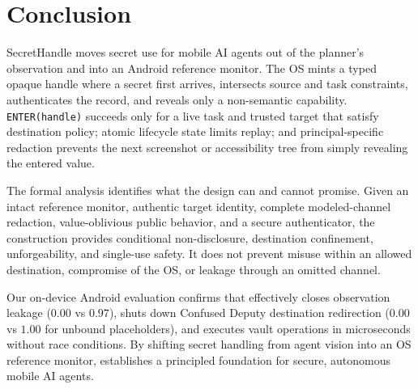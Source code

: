 \section{Conclusion}
\label{sec:conclusion}

SecretHandle moves secret use for mobile AI agents out of the planner's observation and into an Android reference monitor. The OS mints a typed opaque handle where a secret first arrives, intersects source and task constraints, authenticates the record, and reveals only a non-semantic capability. \texttt{ENTER(handle)} succeeds only for a live task and trusted target that satisfy destination policy; atomic lifecycle state limits replay; and principal-specific redaction prevents the next screenshot or accessibility tree from simply revealing the entered value.

The formal analysis identifies what the design can and cannot promise. Given an intact reference monitor, authentic target identity, complete modeled-channel redaction, value-oblivious public behavior, and a secure authenticator, the construction provides conditional non-disclosure, destination confinement, unforgeability, and single-use safety. It does not prevent misuse within an allowed destination, compromise of the OS, or leakage through an omitted channel.

Our on-device Android evaluation confirms that \SH{} effectively closes observation leakage ($0.00$ vs $0.97$), shuts down Confused Deputy destination redirection ($0.00$ vs $1.00$ for unbound placeholders), and executes vault operations in microseconds without race conditions. By shifting secret handling from agent vision into an OS reference monitor, \SH{} establishes a principled foundation for secure, autonomous mobile AI agents.
